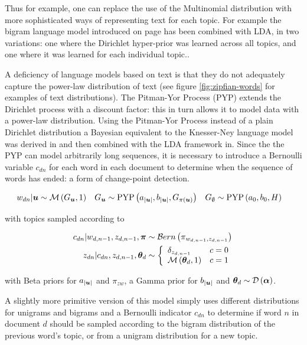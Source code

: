 Thus for example, one can replace the use of the Multinomial distribution with more sophisticated ways of representing text for each topic. For example the bigram language model introduced on page \pageref{sec:chap1:mackay-lang-model} has been combined with LDA, in two variations\cite{Wallach2006}: one where the Dirichlet hyper-prior was learned across all topics, and one where it was learned for each individual topic..

A deficiency of language models based on text is that they do not adequately capture the power-law distribution of text (see figure \ref{fig:zipfian-words} for examples of text distributions). The Pitman-Yor Process (PYP) extends the Dirichlet process with a discount factor: this in turn allows it to model data with a power-law distribution. Using the Pitman-Yor Process instead of a plain Dirichlet distribution a Bayesian equivalent to the Knesser-Ney language model was derived in\cite{Teh2002} and then combined with the LDA framework in\cite{Lindsey2012}. Since the the PYP can model arbitrarily long sequences, it is necessary to introduce a Bernoulli variable $c_{dn}$ for each word in each document to determine when the sequence of words has ended: a form of change-point detection. 

\begin{align}
w_{dn} | \bm u &\sim \mathcal{M} \left( {G_{\bm u}},{1} \right) &
G_{\bm u} &\sim \text{PYP}\left( a_{|\bm u|}, b_{|\bm u|}, G_{\pi(\bm u)} \right) &
G_{\emptyset} &\sim \text{PYP}\left( a_{0}, b_{0}, H \right)
\end{align}

with topics sampled according to

\begin{align}
c_{dn} | w_{d,n-1}, z_{d,n-1}, \bm \pi &\sim \mathcal{B}ern \left(\pi_{ w_{d,n-1}, z_{d,n-1}}\right) \\
z_{dn} | c_{dn}, z_{d,n-1}, { \bm \theta_d } & \sim \left\{ \begin{array}{lr}
     \delta_{z_{d,n - 1}} & c = 0 \\
     \mathcal{M} \left( {{ \bm \theta_d }},{1} \right) & c = 1
 \end{array}\right.
\end{align}

with Beta priors for $a_{|\bm u|}$ and $\pi_{zw}$, a Gamma prior for  $b_{|\bm u|}$ and ${ \bm \theta_d } \sim \mathcal{D} \left( {\bm \alpha} \right)$.

A slightly more primitive version of this model\cite{Wang2007} simply uses different distributions for unigrams and bigrams and a Bernoulli indicator $c_{dn}$ to determine if word $n$ in document $d$ should be sampled according to the bigram distribution of the previous word's topic, or from a unigram distribution for a new topic.

